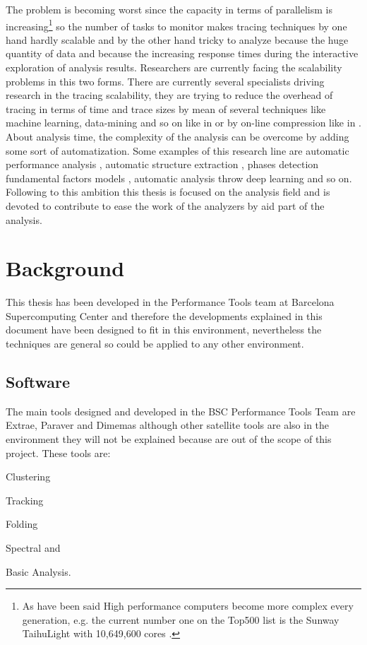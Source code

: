 The problem is becoming worst since the capacity in 
terms of parallelism is increasing\footnote{As have been said High performance 
computers become more complex every generation, e.g. the current number one on 
the Top500 list is the Sunway TaihuLight with 10,649,600 cores\cite{top500_2017} 
.} so the number of tasks to monitor makes 
tracing techniques by one hand hardly scalable and by the other hand tricky to analyze
because the huge quantity of data and because the increasing response times
during the interactive exploration of analysis results. Researchers are currently 
facing the scalability problems in this two forms. 
There are currently several specialists driving research in the tracing
scalability, they are trying to reduce 
the overhead of tracing in terms of time and trace sizes by mean of several 
techniques like machine learning, data-mining and so on like in 
\cite{llort2015intelligent} or by on-line compression like in
\cite{noeth2009scalatrace}. About analysis time, the complexity of the analysis 
can be overcome by adding some sort of automatization. Some examples of this 
research line are automatic performance analysis \cite{wolf2003automatic}, 
automatic structure extraction \cite{casas2007automatic}, phases detection 
\cite{gonzalez2013application} fundamental factors models \cite{casas2008aass}, 
automatic analysis throw deep learning \cite{simon:2017:perfdp} and so on.
Following to this ambition this thesis is focused on the analysis field and is 
devoted to contribute to ease the work of the analyzers by aid part of the analysis. 

\section{Background}\label{s:pt_evironment}

This thesis has been developed in the Performance Tools team at Barcelona
Supercomputing Center and therefore the developments explained in this
document have been designed to fit in this environment, nevertheless the
techniques are general so could be applied to any other environment.

\subsection{Software}

The main tools designed and developed in the BSC Performance Tools Team are 
Extrae, Paraver and Dimemas although other satellite tools are also in the 
environment they will not be explained because are out of the scope of this 
project. These tools are: 
\begin{enumerate*}[label=\roman*)]
  \item Clustering
  \item Tracking
  \item Folding
  \item Spectral and 
  \item Basic Analysis.
\end{enumerate*}


